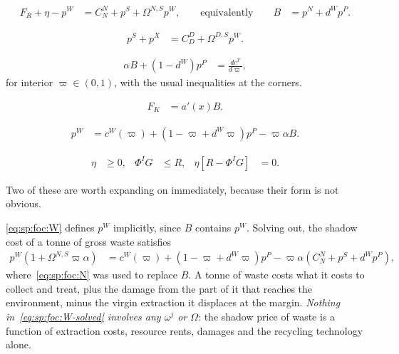 \begin{align}
F_R+\eta-p^W &= C^N_N+p^S+\Omega^{N,S}p^W,
\qquad\text{equivalently}\qquad
B &= p^N+d^Wp^P .
\label{eq:sp:foc:N}
\end{align}

\begin{align}
p^S+p^X &= C^D_D+\Omega^{D,S}p^W .
\label{eq:sp:foc:D}
\end{align}

\begin{align}
\alpha B+\left(1-d^W\right)p^P &= \frac{dc^T}{d\varpi},
\label{eq:sp:foc:varpi}
\end{align}
for interior $\varpi\in\left(0,1\right)$, with the usual inequalities at the corners.

\begin{align}
F_K &= a'\!\left(x\right)B .
\label{eq:sp:foc:KR}
\end{align}

\begin{align}
p^W &= c^W\!\left(\varpi\right)+\left(1-\varpi+d^W\varpi\right)p^P-\varpi\alpha B .
\label{eq:sp:foc:W}
\end{align}

\begin{align}
\eta &\ge0,
&
\Phi^IG &\le R,
&
\eta\left[R-\Phi^IG\right] &= 0 .
\label{eq:sp:foc:cs}
\end{align}

Two of these are worth expanding on immediately, because their form is not obvious.

\eqref{eq:sp:foc:W} defines $p^W$ implicitly, since $B$ contains $p^W$. Solving out, the shadow
cost of a tonne of gross waste satisfies
\begin{align}
p^W\left(1+\Omega^{N,S}\varpi\alpha\right)
&= c^W\!\left(\varpi\right)+\left(1-\varpi+d^W\varpi\right)p^P
-\varpi\alpha\left(C^N_N+p^S+d^Wp^P\right),
\label{eq:sp:foc:W-solved}
\end{align}
where~\eqref{eq:sp:foc:N} was used to replace $B$. A tonne of waste costs what it costs to collect
and treat, plus the damage from the part of it that reaches the environment, minus the virgin
extraction it displaces at the margin. \emph{Nothing in~\eqref{eq:sp:foc:W-solved} involves any
$\omega^j$ or $\Omega$}: the shadow price of waste is a function of extraction costs, resource
rents, damages and the recycling technology alone.


